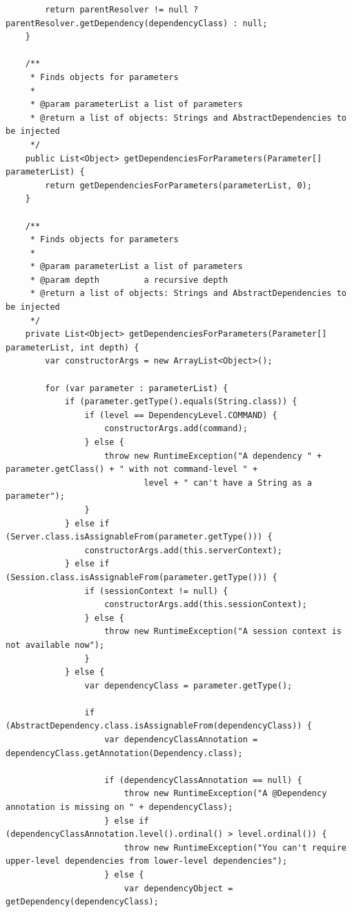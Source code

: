 \documentclass[a4paper,14pt]{extarticle}
\begin{document}
\begin{verbatim}
        return parentResolver != null ? parentResolver.getDependency(dependencyClass) : null;
    }

    /**
     * Finds objects for parameters
     *
     * @param parameterList a list of parameters
     * @return a list of objects: Strings and AbstractDependencies to be injected
     */
    public List<Object> getDependenciesForParameters(Parameter[] parameterList) {
        return getDependenciesForParameters(parameterList, 0);
    }

    /**
     * Finds objects for parameters
     *
     * @param parameterList a list of parameters
     * @param depth         a recursive depth
     * @return a list of objects: Strings and AbstractDependencies to be injected
     */
    private List<Object> getDependenciesForParameters(Parameter[] parameterList, int depth) {
        var constructorArgs = new ArrayList<Object>();

        for (var parameter : parameterList) {
            if (parameter.getType().equals(String.class)) {
                if (level == DependencyLevel.COMMAND) {
                    constructorArgs.add(command);
                } else {
                    throw new RuntimeException("A dependency " + parameter.getClass() + " with not command-level " +
                            level + " can't have a String as a parameter");
                }
            } else if (Server.class.isAssignableFrom(parameter.getType())) {
                constructorArgs.add(this.serverContext);
            } else if (Session.class.isAssignableFrom(parameter.getType())) {
                if (sessionContext != null) {
                    constructorArgs.add(this.sessionContext);
                } else {
                    throw new RuntimeException("A session context is not available now");
                }
            } else {
                var dependencyClass = parameter.getType();

                if (AbstractDependency.class.isAssignableFrom(dependencyClass)) {
                    var dependencyClassAnnotation = dependencyClass.getAnnotation(Dependency.class);

                    if (dependencyClassAnnotation == null) {
                        throw new RuntimeException("A @Dependency annotation is missing on " + dependencyClass);
                    } else if (dependencyClassAnnotation.level().ordinal() > level.ordinal()) {
                        throw new RuntimeException("You can't require upper-level dependencies from lower-level dependencies");
                    } else {
                        var dependencyObject = getDependency(dependencyClass);


\end{verbatim}
\end{document}
